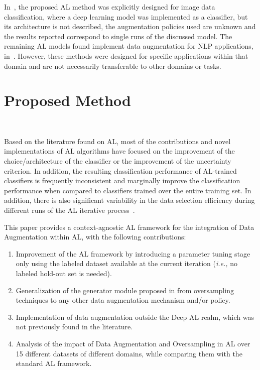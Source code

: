 \documentclass[10pt,journal,compsoc]{IEEEtran}
\begin{document}
In~\cite{Ma2020}, the proposed AL method was explicitly designed for image
data classification, where a deep learning model was implemented as a
classifier, but its architecture is not described, the augmentation policies
used are unknown and the results reported correspond to single runs of the
discussed model. The remaining AL models found implement data augmentation for
NLP applications, in~\cite{Quteineh2020, Li2021framework}. However, these
methods were designed for specific applications within that domain and are not
necessarily transferable to other domains or tasks.

\section{Proposed Method}~\label{sec:proposed_method}

Based on the literature found on AL, most of the contributions and novel
implementations of AL algorithms have focused on the improvement of the
choice/architecture of the classifier or the improvement of the uncertainty
criterion. In addition, the resulting classification performance of AL-trained
classifiers is frequently inconsistent and marginally improve the
classification performance when compared to classifiers trained over the
entire training set. In addition, there is also significant variability in the
data selection efficiency during different runs of the AL iterative
process~\cite{Fonseca2021}.
 
This paper provides a context-agnostic AL framework for the integration of
Data Augmentation within AL, with the following contributions:

\begin{enumerate}
    \item Improvement of the AL framework by introducing a parameter tuning
        stage only using the labeled dataset available at the current
        iteration (\textit{i.e.,} no labeled hold-out set is needed).
    \item Generalization of the generator module proposed in
        \cite{Fonseca2021} from oversampling techniques to any other data
        augmentation mechanism and/or policy.
    \item Implementation of data augmentation outside the Deep AL realm, which
        was not previously found in the literature.
    \item Analysis of the impact of Data Augmentation and Oversampling in AL
        over 15 different datasets of different domains, while comparing them
        with the standard AL framework.
\end{enumerate}
\end{document}
